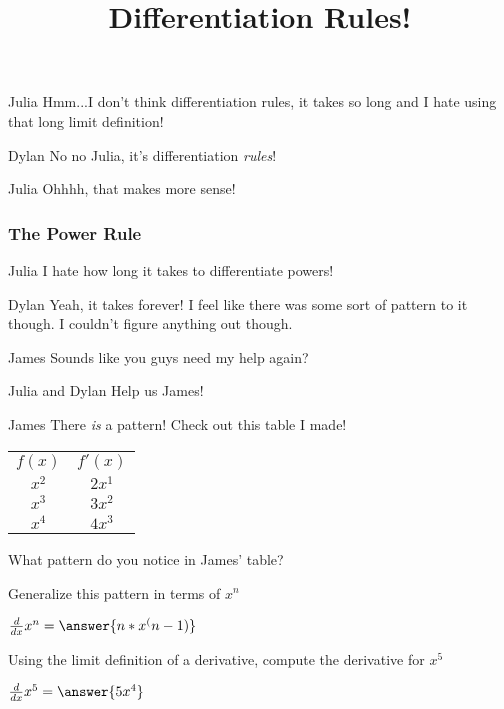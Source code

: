 \documentclass{ximera}
\title{Differentiation Rules!}
\begin{document}
\maketitle
\begin{dialogue}
\item[Julia] Hmm...I don't think differentiation rules, it takes so long and I hate using that long limit definition!
\item[Dylan] No no Julia, it's differentiation \textit{rules}!
\item[Julia] Ohhhh, that makes more sense!

\end{dialogue}
\subsubsection{The Power Rule}
\begin{dialogue}
\item[Julia] I hate how long it takes to differentiate powers!
\item[Dylan] Yeah, it takes forever! I feel like there was some sort of pattern to it though. I couldn't figure anything out though.
\item[James] Sounds like you guys need my help again?
\item[Julia and Dylan] Help us James!
\item[James] There \textit{is} a pattern! Check out this table I made!
\begin{center}
\begin{tabular}{c|c}
$f(x)$ & $f'(x)$ \\
$x^2$ & $2x^1$ \\
$x^3$ & $3x^2$ \\
$x^4$ & $4x^3$
\end{tabular}
\end{center}
\end{dialogue}
\begin{question}
What pattern do you notice in James' table?

\begin{freeResponse}
\end{freeResponse}

Generalize this pattern in terms of $x^n$

$ \frac{d}{dx} x^n =  \answer{n*x^(n-1)}$
\end{question}

\begin{question}
Using the limit definition of a derivative, compute the derivative for $x^5$

$ \frac{d}{dx} x^5 =  \answer{5x^4}$
\end{question}
\end{document}
